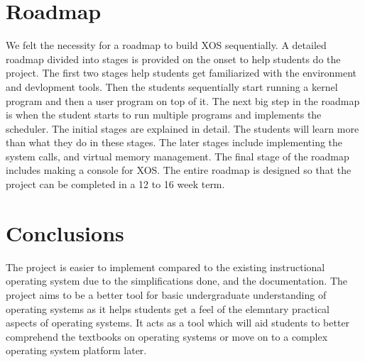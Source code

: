 \documentclass[10pt]{report}
\begin{document}
\chapter{Roadmap}
We felt the necessity for a roadmap to build XOS sequentially. A detailed roadmap divided into stages is provided on the onset to help students do the project. The first two stages help students get familiarized with the environment and devlopment tools. Then the students sequentially start running a kernel program and then a user program on top of it. The next big step in the roadmap is when the student starts to run multiple programs and implements the scheduler. The initial stages are explained in detail. The students will learn more than what they do in these stages. The later stages include implementing the system calls, and virtual memory management. The final stage of the roadmap includes making a console for XOS. The entire roadmap is designed so that the project can be completed in a 12 to 16 week term. \\

\chapter{Conclusions}
The project is easier to implement compared to the existing instructional operating system due to the simplifications done, and the documentation. The project aims to be a better tool for basic undergraduate understanding of operating systems as it helps students get a feel of the elemntary practical aspects of operating systems. It acts as a tool which will aid students to better comprehend the textbooks on operating systems or move on to a complex operating system platform later.




\end{document}
